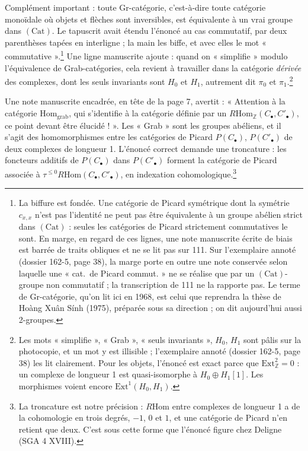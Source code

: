 \documentclass[11pt,a4paper]{article}
\begin{document}
Complément important : toute Gr-catégorie, c'est-à-dire toute catégorie
monoïdale où objets et flèches sont inversibles, est équivalente à un vrai
groupe dans $(\mathrm{Cat})$. Le tapuscrit avait étendu l'énoncé au cas
commutatif, par deux parenthèses tapées en interligne ; la main les biffe, et
avec elles le mot « commutative ».\footnote{La biffure est fondée. Une
catégorie de Picard symétrique dont la symétrie $c_{x,x}$ n'est pas l'identité
ne peut pas être équivalente à un groupe abélien strict dans
$(\mathrm{Cat})$ : seules les catégories de Picard strictement commutatives le
sont. En marge, en regard de ces lignes, une note manuscrite écrite de biais
est barrée de traits obliques et ne se lit pas sur 111. Sur l'exemplaire
annoté (dossier 162-5, page 38), la marge porte en outre une note conservée
selon laquelle une « cat.\ de Picard commut. » ne se réalise que par un
$(\mathrm{Cat})$-groupe non commutatif ; la transcription de 111 ne la
rapporte pas. Le terme de Gr-catégorie, qu'on lit ici en 1968, est celui que
reprendra la thèse de Hoàng Xuân Sính (1975), préparée sous sa direction ; on
dit aujourd'hui aussi 2-groupes.} Une ligne manuscrite ajoute : quand on
« simplifie » modulo l'équivalence de Grab-catégories, cela revient à
travailler dans la catégorie \emph{dérivée} des complexes, dont les seuls
invariants sont $H_0$ et $H_1$, autrement dit $\pi_0$ et $\pi_1$.\footnote{Les
mots « simplifie », « Grab », « seuls invariants », $H_0$, $H_1$ sont pâlis
sur la photocopie, et un mot y est illisible ; l'exemplaire annoté (dossier
162-5, page 38) les lit clairement. Pour les objets, l'énoncé est exact parce
que $\mathrm{Ext}^{2}_{\mathbb{Z}} = 0$ : un complexe de longueur 1 est
quasi-isomorphe à $H_0 \oplus H_1[1]$. Les morphismes voient encore
$\mathrm{Ext}^{1}(H_0, H_1)$.}

Une note manuscrite encadrée, en tête de la page 7, avertit : « Attention à la
catégorie $\mathrm{Hom}_{\mathrm{grab}}$, qui s'identifie à la catégorie
définie par un $R\mathrm{Hom}_{\mathbb{Z}}(C_{\bullet}, C'_{\bullet})$, ce
point devant être élucidé ! ». Les « Grab » sont les groupes abéliens, et il
s'agit des homomorphismes entre les catégories de Picard $P(C_\bullet)$,
$P(C'_\bullet)$ de deux complexes de longueur 1. L'énoncé correct demande une
troncature : les foncteurs additifs de $P(C_\bullet)$ dans $P(C'_\bullet)$
forment la catégorie de Picard associée à $\tau^{\leq 0}
R\mathrm{Hom}(C_\bullet, C'_\bullet)$, en indexation
cohomologique.\footnote{La troncature est notre précision : $R\mathrm{Hom}$
entre complexes de longueur 1 a de la cohomologie en trois degrés, $-1$, $0$
et $1$, et une catégorie de Picard n'en retient que deux. C'est sous cette
forme que l'énoncé figure chez Deligne (SGA 4 XVIII).}
\end{document}
